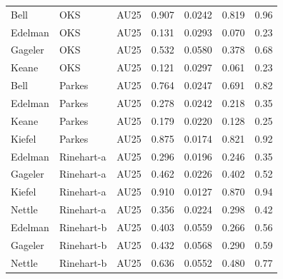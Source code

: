 \documentclass{monashthesis}
\begin{document}
\begin{center}
\begin{longtable}{lllllll}
Bell & OKS & AU25 & 0.907 & 0.0242 & 0.819 & 0.96 \\
Edelman & OKS & AU25 & 0.131 & 0.0293 & 0.070 & 0.23 \\
Gageler & OKS & AU25 & 0.532 & 0.0580 & 0.378 & 0.68 \\
Keane & OKS & AU25 & 0.121 & 0.0297 & 0.061 & 0.23 \\
Bell & Parkes & AU25 & 0.764 & 0.0247 & 0.691 & 0.82 \\
Edelman & Parkes & AU25 & 0.278 & 0.0242 & 0.218 & 0.35 \\
Keane & Parkes & AU25 & 0.179 & 0.0220 & 0.128 & 0.25 \\
Kiefel & Parkes & AU25 & 0.875 & 0.0174 & 0.821 & 0.92 \\
Edelman & Rinehart-a & AU25 & 0.296 & 0.0196 & 0.246 & 0.35 \\
Gageler & Rinehart-a & AU25 & 0.462 & 0.0226 & 0.402 & 0.52 \\
Kiefel & Rinehart-a & AU25 & 0.910 & 0.0127 & 0.870 & 0.94 \\
Nettle & Rinehart-a & AU25 & 0.356 & 0.0224 & 0.298 & 0.42 \\
Edelman & Rinehart-b & AU25 & 0.403 & 0.0559 & 0.266 & 0.56 \\
Gageler & Rinehart-b & AU25 & 0.432 & 0.0568 & 0.290 & 0.59 \\
Nettle & Rinehart-b & AU25 & 0.636 & 0.0552 & 0.480 & 0.77 \\
\end{longtable}
\end{center}
\end{document}
